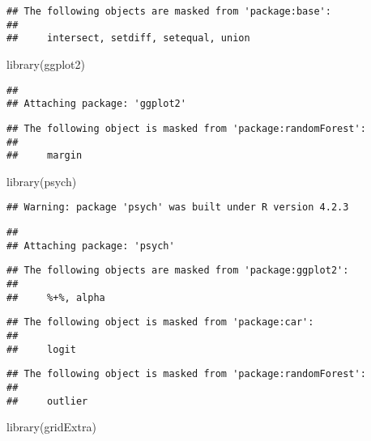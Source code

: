 \documentclass[
]{article}
\newenvironment{Shaded}{\begin{snugshade}}{\end{snugshade}}
\newcommand{\FunctionTok}[1]{\textcolor[rgb]{0.00,0.00,0.00}{#1}}
\newcommand{\NormalTok}[1]{#1}
\begin{document}
\begin{verbatim}
## The following objects are masked from 'package:base':
## 
##     intersect, setdiff, setequal, union
\end{verbatim}

\begin{Shaded}
\begin{Highlighting}[]
\FunctionTok{library}\NormalTok{(ggplot2)}
\end{Highlighting}
\end{Shaded}

\begin{verbatim}
## 
## Attaching package: 'ggplot2'
\end{verbatim}

\begin{verbatim}
## The following object is masked from 'package:randomForest':
## 
##     margin
\end{verbatim}

\begin{Shaded}
\begin{Highlighting}[]
\FunctionTok{library}\NormalTok{(psych)}
\end{Highlighting}
\end{Shaded}

\begin{verbatim}
## Warning: package 'psych' was built under R version 4.2.3
\end{verbatim}

\begin{verbatim}
## 
## Attaching package: 'psych'
\end{verbatim}

\begin{verbatim}
## The following objects are masked from 'package:ggplot2':
## 
##     %+%, alpha
\end{verbatim}

\begin{verbatim}
## The following object is masked from 'package:car':
## 
##     logit
\end{verbatim}

\begin{verbatim}
## The following object is masked from 'package:randomForest':
## 
##     outlier
\end{verbatim}

\begin{Shaded}
\begin{Highlighting}[]
\FunctionTok{library}\NormalTok{(gridExtra)}
\end{Highlighting}
\end{Shaded}
\end{document}
